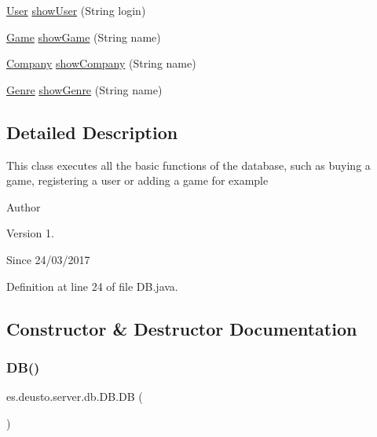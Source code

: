 \begin{DoxyCompactItemize}
\item 
\hyperlink{classes_1_1deusto_1_1server_1_1db_1_1data_1_1_user}{User} \hyperlink{classes_1_1deusto_1_1server_1_1db_1_1_d_b_ac85523faea523033439a932bbcab2c7e}{show\+User} (String login)
\item 
\hyperlink{classes_1_1deusto_1_1server_1_1db_1_1data_1_1_game}{Game} \hyperlink{classes_1_1deusto_1_1server_1_1db_1_1_d_b_adba76c20f2fc7ed01d486564d881a718}{show\+Game} (String name)
\item 
\hyperlink{classes_1_1deusto_1_1server_1_1db_1_1data_1_1_company}{Company} \hyperlink{classes_1_1deusto_1_1server_1_1db_1_1_d_b_ab5edf3ae158bb0501a882b1d724cc2a8}{show\+Company} (String name)
\item 
\hyperlink{classes_1_1deusto_1_1server_1_1db_1_1data_1_1_genre}{Genre} \hyperlink{classes_1_1deusto_1_1server_1_1db_1_1_d_b_a207ddeb183db925dc20f095033aa4d94}{show\+Genre} (String name)
\end{DoxyCompactItemize}


\subsection{Detailed Description}
This class executes all the basic functions of the database, such as buying a game, registering a user or adding a game for example \begin{DoxyAuthor}{Author}

\end{DoxyAuthor}
\begin{DoxyVersion}{Version}
1. 
\end{DoxyVersion}
\begin{DoxySince}{Since}
24/03/2017 
\end{DoxySince}


Definition at line 24 of file D\+B.\+java.



\subsection{Constructor \& Destructor Documentation}
\mbox{\label{classes_1_1deusto_1_1server_1_1db_1_1_d_b_ab53f32f36928ba9aa3ddff65fce395dc}} 
\subsubsection{\texorpdfstring{D\+B()}{DB()}\hspace{0.1cm}{\footnotesize\ttfamily [1/2]}}
{\footnotesize\ttfamily es.\+deusto.\+server.\+db.\+D\+B.\+DB (\begin{DoxyParamCaption}{ }\end{DoxyParamCaption})}

